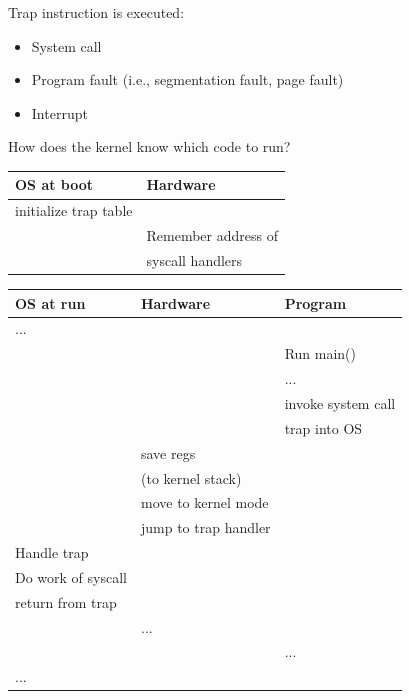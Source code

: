 \begin{slide}

    
    Trap instruction is executed:
    \begin{itemize}
        \item System call
        \item Program fault (i.e., segmentation fault, page fault)
        \item Interrupt 
    \end{itemize}
    \bigskip
    
    How does the kernel know which code to run?
    
\end{slide}

\begin{slide}

    
    \vspace{-3mm}
    \footnotesize
    
    \begin{tabular}{ p{40mm} p{40mm} } 
      \textbf{OS at boot} & \textbf{Hardware} \\ \hline
      initialize trap table & \\ 
                            & Remember address of  \\
                            & syscall handlers \\
    \end{tabular}
    \medskip
    
    \begin{tabular}{ p{40mm} p{40mm} p{40mm} } 
        \textbf{OS at run} & \textbf{Hardware} & \textbf{Program} \\ \hline
         ... & & \\
                         &                   & Run main() \\
                         &                     & ... \\
                         &                     & invoke system call \\
                         &                   & trap into OS \\
                         & save regs         & \\
                         & (to kernel stack) & \\
                         & move to kernel mode & \\
                         & jump to trap handler & \\
        Handle trap & & \\
        Do work of syscall & & \\
        return from trap & & \\
         & ... & \\
         & & ... \\
        ... & & \\     
    \end{tabular}
    
	\normalsize
	
\end{slide}

